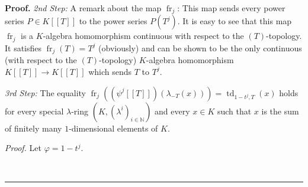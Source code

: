 \documentclass[numbers=enddot,12pt,final,onecolumn,notitlepage]{scrartcl}%
\newenvironment{proof}[1][Proof]{\noindent\textbf{#1.} }{\ \rule{0.5em}{0.5em}}
\begin{document}
\begin{proof}
\textit{2nd Step:} A remark about the map $\operatorname*{fr}\nolimits_{j}$:
This map sends every power series $P\in K\left[  \left[  T\right]  \right]  $
to the power series $P\left(  T^{j}\right)  $. It is easy to see that this map
$\operatorname*{fr}\nolimits_{j}$ is a $K$-algebra homomorphism continuous
with respect to the $\left(  T\right)  $-topology. It satisfies
$\operatorname*{fr}\nolimits_{j}\left(  T\right)  =T^{j}$ (obviously) and can
be shown to be the only continuous (with respect to the $\left(  T\right)
$-topology) $K$-algebra homomorphism $K\left[  \left[  T\right]  \right]
\rightarrow K\left[  \left[  T\right]  \right]  $ which sends $T$ to $T^{j}$.

\textit{3rd Step:} The equality $\operatorname*{fr}\nolimits_{j}\left(
\left(  \psi^{j}\left[  \left[  T\right]  \right]  \right)  \left(
\lambda_{-T}\left(  x\right)  \right)  \right)  =\operatorname*{td}%
\nolimits_{1-t^{j},T}\left(  x\right)  $ holds for every special $\lambda
$-ring $\left(  K,\left(  \lambda^{i}\right)  _{i\in\mathbb{N}}\right)  $ and
every $x\in K$ such that $x$ is the sum of finitely many $1$-dimensional
elements of $K$.

\textit{Proof.} Let $\varphi=1-t^{j}$.


\end{proof}
\end{document}
